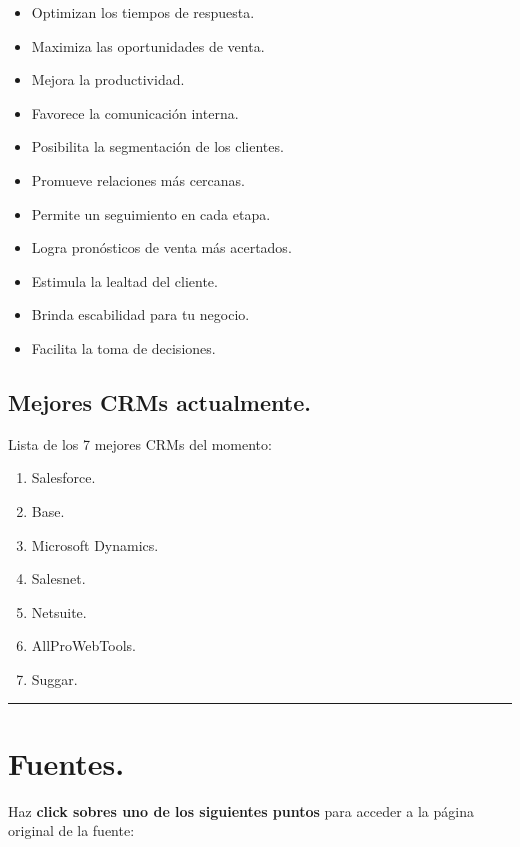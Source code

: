 \documentclass[
]{article}
\providecommand{\tightlist}{%
  \setlength{\itemsep}{0pt}\setlength{\parskip}{0pt}}
\begin{document}
\begin{itemize}
\tightlist
\item
  Optimizan los tiempos de respuesta.
\item
  Maximiza las oportunidades de venta.
\item
  Mejora la productividad.
\item
  Favorece la comunicación interna.
\item
  Posibilita la segmentación de los clientes.
\item
  Promueve relaciones más cercanas.
\item
  Permite un seguimiento en cada etapa.
\item
  Logra pronósticos de venta más acertados.
\item
  Estimula la lealtad del cliente.
\item
  Brinda escabilidad para tu negocio.
\item
  Facilita la toma de decisiones.
\end{itemize}

\hypertarget{mejores-crms-actualmente.}{%
\subsection{Mejores CRMs actualmente.}\label{mejores-crms-actualmente.}}

Lista de los 7 mejores CRMs del momento:

\begin{enumerate}
\tightlist
\item
  Salesforce.
\item
  Base.
\item
  Microsoft Dynamics.
\item
  Salesnet.
\item
  Netsuite.
\item
  AllProWebTools.
\item
  Suggar.
\end{enumerate}

\begin{center}\rule{0.5\linewidth}{0.5pt}\end{center}

\hypertarget{fuentes.}{%
\section{Fuentes.}\label{fuentes.}}

Haz \textbf{click sobres uno de los siguientes puntos} para acceder a la
página original de la fuente:
\end{document}

